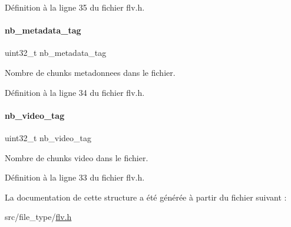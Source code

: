 Définition à la ligne 35 du fichier flv.\+h.

\mbox{\label{a00166_a4c809685cb46c0124ea990d5c5f73a10}} 
\paragraph{\texorpdfstring{nb\+\_\+metadata\+\_\+tag}{nb\_metadata\_tag}}
{\footnotesize\ttfamily uint32\+\_\+t nb\+\_\+metadata\+\_\+tag}

Nombre de chunks metadonnees dans le fichier. 

Définition à la ligne 34 du fichier flv.\+h.

\mbox{\label{a00166_aa9ec6aaa8a2303b01ea8da69314e8a29}} 
\paragraph{\texorpdfstring{nb\+\_\+video\+\_\+tag}{nb\_video\_tag}}
{\footnotesize\ttfamily uint32\+\_\+t nb\+\_\+video\+\_\+tag}

Nombre de chunks video dans le fichier. 

Définition à la ligne 33 du fichier flv.\+h.



La documentation de cette structure a été générée à partir du fichier suivant \+:\begin{DoxyCompactItemize}
\item 
src/file\+\_\+type/\hyperlink{a00083}{flv.\+h}\end{DoxyCompactItemize}

